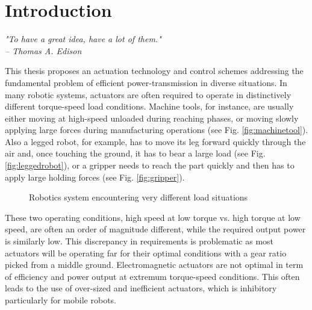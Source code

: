 \chapter{Introduction}
\label{sec:Introduction}

{
\begin{flushright}
\textit{"To have a great idea, have a lot of them."} \\
\emph{-- Thomas A. Edison}
\end{flushright}
}
\vspace{10pt}


This thesis proposes an actuation technology and control schemes addressing the fundamental problem of efficient power-transmission in diverse situations. In many robotic systems, actuators are often required to operate in distinctively different torque-speed load conditions. Machine tools, for instance, are usually either moving at high-speed unloaded during reaching phases, or moving slowly applying large forces during manufacturing operations (see Fig. \ref{fig:machinetool}). Also a legged robot, for example, has to move its leg forward quickly through the air and, once touching the ground, it has to bear a large load (see Fig. \ref{fig:leggedrobot}), or a gripper needs to reach the part quickly and then has to apply large holding forces (see Fig. \ref{fig:gripper}).
%
\begin{figure}[H]
        \centering
        \caption{Robotics system encountering very different load situations}
				\label{fig:app}
\end{figure}

These two operating conditions, high speed at low torque vs. high torque at low speed, are often an order of magnitude different, while the required output power is similarly low. This discrepancy in requirements is problematic as most actuators will be operating far for their optimal conditions with a gear ratio picked from a middle ground. Electromagnetic actuators are not optimal in term of efficiency and power output at extremum torque-speed conditions. This often leads to the use of over-sized and inefficient actuators, which is inhibitory particularly for mobile robots.


